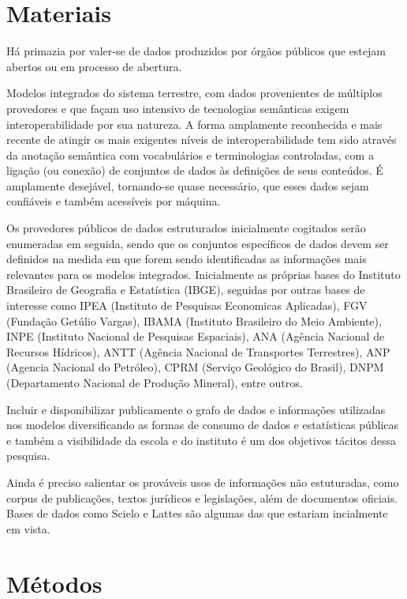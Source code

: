 \documentclass[
	12pt,				%
	openany,			%
	oneside,			%
	a4paper,			%
	english,			%
	french,				%
	spanish,			%
	brazil,				%
	]{abntex2}
\begin{document}
\section{Materiais}

Há primazia por valer-se de dados produzidos por órgãos públicos que estejam abertos ou em processo de abertura.

Modelos integrados do sistema terrestre, com dados provenientes de múltiplos provedores e que façam uso intensivo de tecnologias semânticas exigem interoperabilidade por sua natureza. A forma amplamente reconhecida e mais recente de atingir os mais exigentes níveis de interoperabilidade tem sido através da anotação semântica com vocabulários e terminologias controladas, com a ligação (ou conexão) de conjuntos de dados às definições de seus conteúdos. É amplamente desejável, tornando-se quase necessário, que esses dados sejam confiáveis e também acessíveis por máquina.

Os provedores públicos de dados estruturados inicialmente cogitados serão enumeradas em seguida, sendo que os conjuntos específicos de dados devem ser definidos na medida em que forem sendo identificadas as informações mais relevantes para os modelos integrados. Inicialmente as próprias bases do Instituto Brasileiro de Geografia e Estatística (IBGE), seguidas por outras bases de interesse como IPEA (Instituto de Pesquisas Economicas Aplicadas), FGV (Fundação Getúlio Vargas), IBAMA (Instituto Brasileiro do Meio Ambiente), INPE (Instituto Nacional de Pesquisas Espaciais), ANA (Agência Nacional de Recursos Hídricos), ANTT (Agência Nacional de Transportes Terrestres), ANP (Agencia Nacional do Petróleo), CPRM (Serviço Geológico do Brasil), DNPM (Departamento Nacional de Produção Mineral), entre outros.

Incluir e disponibilizar publicamente o grafo de dados e informações utilizadas nos modelos diversificando as formas de consumo de dados e estatísticas públicas e também a visibilidade da escola e do instituto é um dos objetivos tácitos dessa pesquisa.

Ainda é preciso salientar os prováveis usos de informações não estuturadas, como corpus de publicações, textos jurídicos e legislações, além de documentos oficiais. Bases de dados como Scielo e Lattes são algumas das que estariam incialmente em vista.

\section{Métodos}
\end{document}

